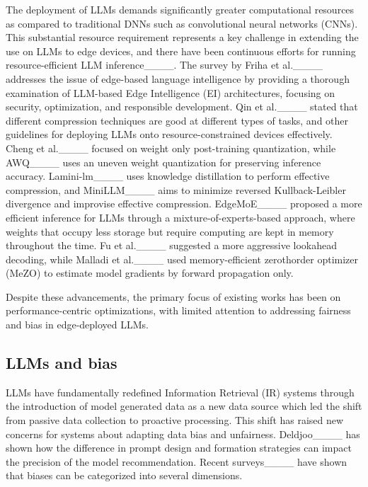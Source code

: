 The deployment of LLMs demands significantly greater computational resources as compared to traditional DNNs such as convolutional neural networks (CNNs). 
This substantial resource requirement represents a key challenge in extending the use on LLMs to edge devices, and there have been continuous efforts for running resource-efficient LLM inference____. 
The survey by Friha et al.____ addresses the issue of edge-based language intelligence by providing a thorough examination of LLM-based Edge Intelligence (EI) architectures, focusing on security, optimization, and responsible development. 
Qin et al.____ stated that different compression techniques are good at different types of tasks, and other guidelines for deploying LLMs onto resource-constrained devices effectively.  
Cheng et al.____ focused on weight only post-training quantization, while AWQ____ uses an uneven weight quantization for preserving inference accuracy. Lamini-lm____ uses knowledge distillation to perform effective compression, and MiniLLM____ aims to minimize reversed Kullback-Leibler divergence and improvise effective compression.
EdgeMoE____ proposed a more efficient inference for LLMs through a mixture-of-experts-based approach, where weights that occupy less storage but require computing are kept in memory throughout the time. Fu et al.____ suggested a more aggressive lookahead decoding, while Malladi et al.____ used memory-efficient zerothorder optimizer (MeZO) to estimate model gradients by forward propagation only. 

Despite these advancements, the primary focus of existing works has been on performance-centric optimizations, with limited attention to addressing fairness and bias in edge-deployed LLMs. 



\subsection{LLMs and bias}

LLMs have fundamentally redefined Information Retrieval (IR) systems through the introduction of model generated data as a new data source which led the shift from passive data collection to proactive processing. 
This shift has raised new concerns for systems about adapting data bias and unfairness. Deldjoo____ has shown how the difference in prompt design and formation strategies can impact the precision of the model recommendation. 
Recent surveys____ have shown that biases can be categorized into several dimensions. 


